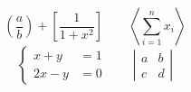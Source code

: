 \documentclass[12pt,letterpaper]{article}
\begin{document}
\[
 \left(\frac{a}{b}\right) + \left[\frac{1}{1+x^2}\right]
 \qquad \left\langle\sum_{i=1}^{n} x_i\right\rangle
\]
\[
 \left\{\begin{aligned}x+y&=1\\2x-y&=0\end{aligned}\right.
 \qquad \left|\begin{matrix}a&b\\c&d\end{matrix}\right|
\]
\end{document}
